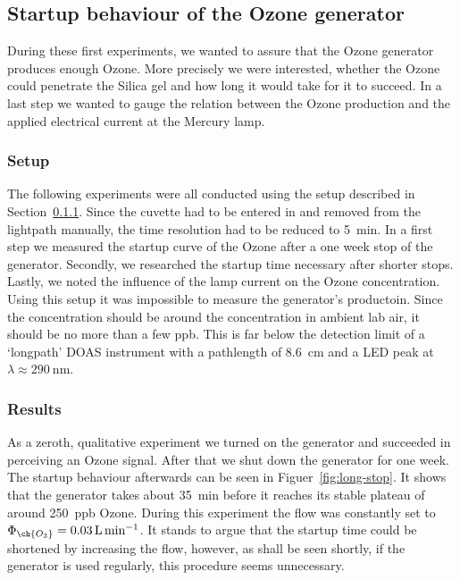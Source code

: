 \subsection{Startup behaviour of the Ozone generator}
\label{sec:ozone}

During these first experiments, we wanted to assure that the Ozone
generator produces enough Ozone. More precisely we were interested,
whether the Ozone could penetrate the Silica gel and how long it would
take for it to succeed. In a last step we wanted to gauge the relation
between the Ozone production and the applied electrical current at the
Mercury lamp.

\subsubsection{Setup}
\label{sec:ozone-setup}

The following experiments were all conducted using the setup described
in Section~\ref{sec:ozone-setup}. Since the cuvette had to be entered
in and removed from the lightpath manually, the time resolution had to
be reduced to \SI{5}{\minute}. In a first step we measured the startup
curve of the Ozone after a one week stop of the generator. Secondly, we
researched the startup time necessary after shorter stops. Lastly, we
noted the influence of the lamp current on the Ozone concentration.
Using this setup it was impossible to measure the generator's
 productoin. Since the concentration should
be around the  concentration in ambient lab air, it should be
no more than a few \si{ppb}. This is far below the detection limit of
a `longpath' DOAS instrument with a pathlength of
\SI{8.6}{\centi\meter} and a LED peak at $\lambda \approx
\SI{290}{\nano\meter}$.

\subsubsection{Results}
\label{sec:ozone-results}

As a zeroth, qualitative experiment we turned on the generator
and succeeded in perceiving an Ozone signal. After that we shut down the generator
for one week. The startup behaviour afterwards can be seen in
Figuer~\ref{fig:long-stop}. It shows that the generator takes about
\SI{35}{\minute} before it reaches its stable plateau of around
\SI{250}{ppb} Ozone. During this experiment the flow was constantly
set to $\Phi_{\ch{O_3}} = \SI{0.03}{\liter\per\minute}$. It stands to
argue that the startup time could be shortened by increasing the flow,
however, as shall be seen shortly, if the
generator is used regularly, this procedure seems unnecessary.

